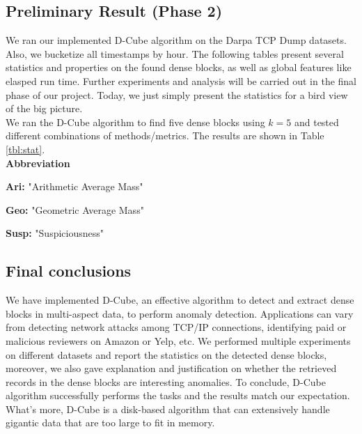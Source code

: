 


\subsection{Preliminary Result (Phase 2)}

We ran our implemented D-Cube algorithm on the Darpa TCP Dump datasets. Also, we bucketize all timestamps by hour. The following tables present several statistics and properties on the found dense blocks, as well as global features like elasped run time. 
Further experiments and analysis will be carried out in the final phase of our project. Today, we just simply present the statistics for a bird view of the big picture. \\
We ran the D-Cube algorithm to find five dense blocks using $k = 5$ and tested different combinations of methods/metrics. The results are shown in Table \ref{tbl:stat}.\\ 

\textbf{Abbreviation}
\bit
\setlength\itemsep{0.8em}
\item \textbf{Ari:} "Arithmetic Average Mass" 
\item \textbf{Geo:} "Geometric Average Mass" 
\item \textbf{Susp:} "Suspiciousness"
\eit

\subsection{Final conclusions}

We have implemented D-Cube, an effective algorithm to detect and extract dense blocks in multi-aspect data, to perform anomaly detection. Applications can vary from detecting network attacks among TCP/IP connections, identifying paid or malicious reviewers on Amazon or Yelp, etc. We performed multiple experiments on different datasets and report the statistics on the detected dense blocks, moreover, we also gave explanation and justification on whether the retrieved records in the dense blocks are interesting anomalies. To conclude, D-Cube algorithm successfully performs the tasks and the results match our expectation. What's more, D-Cube is a disk-based algorithm that can extensively handle gigantic data that are too large to fit in memory. 

